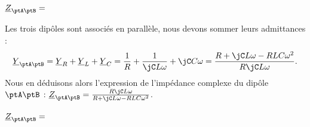 \begin{enonce}
	$\underline{Z}_{\ptA\ptB} = $ 
\end{enonce}


\begin{corrige}
	Les trois dipôles sont associés en parallèle, nous devons sommer leurs admittances : 
	\begin{align*} 
		\underline{Y}_{\ptA\ptB}  =\underline{Y}_{R}+\underline{Y}_{L} +\underline{Y}_{C}
		 =\frac{1}{R}+\frac{1}{\jC L\omega} +\jC C\omega 
		 =\frac{R+\jC L\omega-RLC \omega^2}{R\jC L\omega}.
	\end{align*}
	Nous en déduisons alors l'expression de l'impédance complexe du dipôle $\ptA\ptB$ : 
	$\underline{Z}_{\ptA\ptB}=\frac{R \jC L\omega}{R+\jC L\omega -RLC \omega^2 }$.
\end{corrige}



\begin{enonce}
	$\underline{Z}_{\ptA\ptB} = $ 
\end{enonce}



